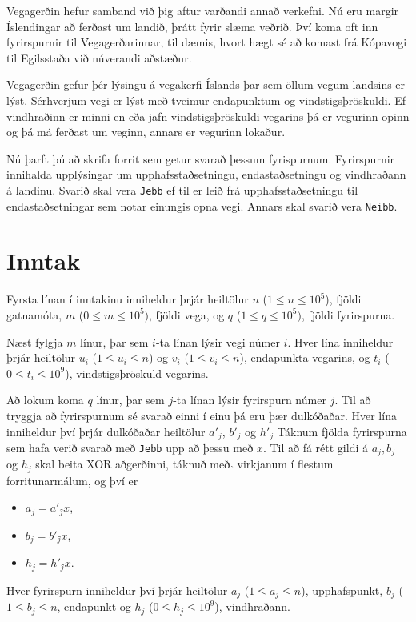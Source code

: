 
Vegagerðin hefur samband við þig aftur varðandi annað verkefni.
Nú eru margir Íslendingar að ferðast um landið, þrátt fyrir slæma veðrið.
Því koma oft inn fyrirspurnir til Vegagerðarinnar, til dæmis, hvort hægt
sé að komast frá Kópavogi til Egilsstaða við núverandi aðstæður.

Vegagerðin gefur þér lýsingu á vegakerfi Íslands þar sem
öllum vegum landsins er lýst. Sérhverjum vegi er lýst með
tveimur endapunktum og vindstigsþröskuldi.
Ef vindhraðinn er minni en eða jafn vindstigsþröskuldi vegarins þá
er vegurinn opinn og þá má ferðast um veginn, annars er vegurinn
lokaður.

Nú þarft þú að skrifa forrit sem getur svarað þessum fyrispurnum.
Fyrirspurnir innihalda upplýsingar um upphafsstaðsetningu, endastaðsetningu
og vindhraðann á landinu. Svarið skal vera \texttt{Jebb} ef til er leið
frá upphafsstaðsetningu til endastaðsetningar sem notar einungis opna vegi.
Annars skal svarið vera \texttt{Neibb}.

\section*{Inntak}
Fyrsta línan í inntakinu inniheldur þrjár heiltölur $n$ ($1 \leq n \leq
10^5$), fjöldi gatnamóta, $m$ ($0 \leq m \leq 10^5)$, fjöldi vega,
og $q$ ($1 \leq q \leq 10^5)$, fjöldi fyrirspurna.

Næst fylgja $m$ línur, þar sem $i$-ta línan lýsir vegi númer $i$.
Hver lína inniheldur þrjár heiltölur $u_i$ ($1 \leq u_i \leq n$) og $v_i$
($1 \leq v_i \leq n$), endapunkta vegarins, og $t_i$ ($0 \leq t_i \leq 10^9$),
vindstigsþröskuld vegarins.

Að lokum koma $q$ línur, þar sem $j$-ta línan lýsir fyrirspurn númer $j$.
Til að tryggja að fyrirspurnum sé svarað einni í einu þá eru þær dulkóðaðar.
Hver lína inniheldur því þrjár dulkóðaðar heiltölur $a'_j$, $b'_j$ og $h'_j$
Táknum fjölda fyrirspurna sem hafa verið svarað með \texttt{Jebb} upp að þessu
með $x$.
Til að fá rétt gildi á $a_j, b_j$ og $h_j$ skal beita XOR aðgerðinni, táknuð með
$\hat{}$ virkjanum í flestum forritunarmálum, og því er
\begin{itemize}
    \item $a_j = a'_j \hat{} x$,
    \item $b_j = b'_j \hat{} x$,
    \item $h_j = h'_j \hat{} x$.
\end{itemize}
Hver fyrirspurn inniheldur því þrjár heiltölur $a_j$ ($1 \leq a_j \leq n$), upphafspunkt,
$b_j$ ($1 \leq b_j \leq n$, endapunkt og $h_j$ ($0 \leq h_j \leq 10^9$), vindhraðann.

